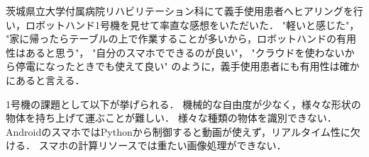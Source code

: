 茨城県立大学付属病院リハビリテーション科にて義手使用患者へヒアリングを行い，ロボットハンド1号機を見せて率直な感想をいただいた．
"軽いと感じた"，
"家に帰ったらテーブルの上で作業することが多いから，ロボットハンドの有用性はあると思う"，
"自分のスマホでできるのが良い"，
"クラウドを使わないから停電になったときでも使えて良い"
のように，義手使用患者にも有用性は確かにあると言える．

1号機の課題として以下が挙げられる．
機械的な自由度が少なく，様々な形状の物体を持ち上げて運ぶことが難しい．
様々な種類の物体を識別できない．
AndroidのスマホではPythonから制御すると動画が使えず，リアルタイム性に欠ける．
スマホの計算リソースでは重たい画像処理ができない．


